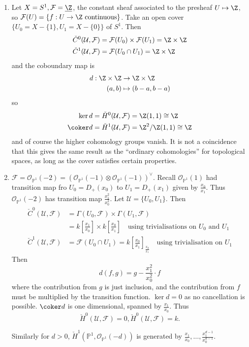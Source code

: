 \documentclass[a4paper]{article}
\renewcommand*{\P}{\mathbb{P}}
\newcommand{\sh}[1]{\mathcal{#1}} %
\begin{document}
\begin{eg}\leavevmode
  \begin{enumerate}
  \item Let \(X = S^1, \sh F = \underline \Z\), the constant sheaf associated to the presheaf \(U \mapsto \Z\), so \(\sh F(U) = \{f: U \to \Z \text{ continuous}\}\). Take an open cover \(\{U_0 = X - \{1\}, U_1 = X - \{0\}\}\) of \(S^1\). Then
    \begin{align*}
      \check C^0(\mathcal U, \sh F) &= \sh F(U_0) \times \sh F(U_1) = \Z \times \Z \\
      \check C^1(\mathcal U, \sh F) &= \sh F(U_0 \cap U_1) = \Z \times \Z
    \end{align*}
    and the coboundary map is
    \begin{align*}
      d: \Z \times \Z &\to \Z \times \Z \\
      (a, b) &\mapsto (b - a, b - a)
    \end{align*}
    so
    \begin{align*}
      \ker d &= \check H^0(\mathcal U, \sh F) = \Z(1, 1) \cong \Z \\
      \coker d &= \check H^1(\mathcal U, \sh F) = \Z^2/\Z(1, 1) \cong \Z
    \end{align*}
    and of course the higher cohomology groups vanish. It is not a coincidence that this gives the same result as the ``ordinary cohomologies'' for topological spaces, as long as the cover satisfies certain properties.
  \item \(\sh F = \sh O_{\P^1}(-2) = (\sh O_{\P^1}(-1) \otimes \sh O_{\P^1}(-1))^\vee\). Recall \(\sh O_{\P^1}(1)\) had transition map fro \(U_0 = D_+(x_0)\) to \(U_1 = D_+(x_1)\) given by \(\frac{x_0}{x_1}\). Thus \(\sh O_{\P^1}(-2)\) has transition map \(\frac{x_1^2}{x_0^2}\). Let \(\mathcal U = \{U_0, U_1\}\). Then
    \begin{align*}
      \check C^0(\mathcal U, \sh F) &= \Gamma(U_0, \sh F) \times \Gamma(U_1, \sh F) \\
                                               &= k[\frac{x_1}{x_0}] \times k[\frac{x_0}{x_1}] \quad \text{using trivialisations on \(U_0\) and \(U_1\)} \\
      \check C^1(\mathcal U, \sh F) &= \sh F(U_0 \cap U_1) = k[\frac{x_0}{x_1}]_{\frac{x_0}{x_1}} \quad \text{using trivialisation on \(U_1\)}
    \end{align*}
    Then
    \[
      d(f, g) = g - \frac{x_1^2}{x_0^2} \cdot f
    \]
    where the contribution from \(g\) is just inclusion, and the contribution from \(f\) must be multiplied by the transition function. \(\ker d = 0\) as no cancellation is possible. \(\coker d\) is one dimensional, spanned by  \(\frac{x_1}{x_0}\). Thus
    \[
      \check H^0(\mathcal U, \sh F) = 0, \check H^0(\mathcal U, \sh F) = k.
    \]

    Similarly for \(d > 0\), \(\check H^1(\P^1, \sh O_{\P^1}(-d))\) is generated by \(\frac{x_1}{x_0}, \dots, \frac{x_1^{d - 1}}{x_0^{d - 1}}\).
  \end{enumerate}
\end{eg}
\end{document}
